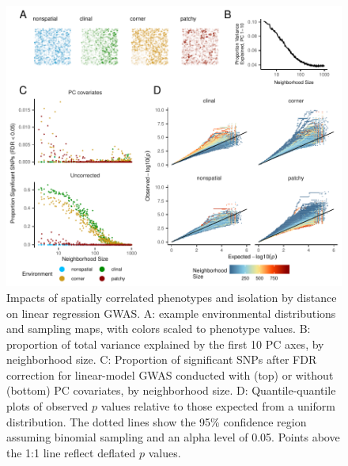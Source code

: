 \documentclass[10pt,twoside,lineno]{gsajnl}
\begin{document}
\afterpage{\clearpage}
\begin{figure}[p]
\centering
\includegraphics[width=\textwidth]{figures/gwas_summary.pdf}
\caption{Impacts of spatially correlated phenotypes and isolation by distance on linear regression GWAS.  A: example environmental distributions and sampling maps, with colors scaled to phenotype values. B: proportion of total variance explained by the first 10 PC axes, by neighborhood size. C: Proportion of significant SNPs after FDR correction for linear-model GWAS conducted with (top) or without (bottom) PC covariates, by neighborhood size. D: Quantile-quantile plots of observed $p$ values relative to those expected from a uniform distribution. The dotted lines show the 95\% confidence region assuming binomial sampling and an alpha level of 0.05. Points above the 1:1 line reflect deflated $p$ values.}
\label{fig:gwas}
\end{figure}
\end{document}
